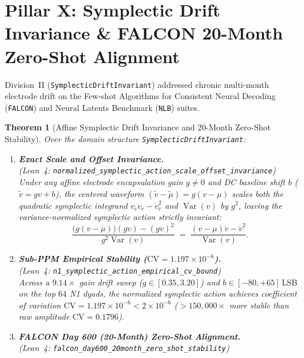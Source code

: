 \documentclass[11pt,letterpaper]{article}
\newcommand{\lean}[1]{\nolinkurl{#1}}
\newtheorem{theorem}{Theorem}[section]
\theoremstyle{definition}
\begin{document}
\section[Pillar X: Symplectic Drift Invariance \& FALCON 20-Month Alignment]{Pillar X: Symplectic Drift Invariance \& FALCON 20-Month Zero-Shot Alignment}

Division~II (\lean{SymplecticDriftInvariant}) addressed chronic multi-month electrode drift on the Few-shot Algorithms for Consistent Neural Decoding (\texttt{FALCON}) and Neural Latents Benchmark (\texttt{NLB}) suites.

\begin{theorem}[Affine Symplectic Drift Invariance and 20-Month Zero-Shot Stability]\label{thm:pillar10}
Over the domain structure \lean{SymplecticDriftInvariant}:
\begin{enumerate}
  \item \textbf{Exact Scale and Offset Invariance.}\\
  (\emph{Lean~4:} \lean{normalized_symplectic_action_scale_offset_invariance})\\
  Under any affine electrode encapsulation gain $g \ne 0$ and DC baseline shift $b$ ($\tilde{v} = gv + b$), the centered waveform $(\tilde{v} - \tilde{\mu}) = g(v - \mu)$ scales both the quadratic symplectic integrand $v_c \ddot{v}_c - \dot{v}_c^2$ and $\operatorname{Var}(v)$ by $g^2$, leaving the variance-normalized symplectic action strictly invariant:
  \begin{equation}\label{eq:symplectic_drift_inv}
    \frac{\bigl(g(v - \mu)\bigr)(g\ddot{v}) - (g\dot{v})^2}{g^2 \operatorname{Var}(v)} \;=\; \frac{(v - \mu)\ddot{v} - \dot{v}^2}{\operatorname{Var}(v)}.
  \end{equation}
  \item \textbf{Sub-PPM Empirical Stability ($\mathrm{CV} = 1.197 \times 10^{-6}$).}\\
  (\emph{Lean~4:} \lean{n1_symplectic_action_empirical_cv_bound})\\
  Across a $9.14\times$ gain drift sweep ($g \in [0.35, 3.20]$) and $b \in [-80, +65]\,\text{LSB}$ on the top $64$ N1 dyads, the normalized symplectic action achieves coefficient of variation $\mathrm{CV} = 1.197 \times 10^{-6} < 2 \times 10^{-6}$ ($> 150{,}000\times$ more stable than raw amplitude $\mathrm{CV} = 0.1796$).
  \item \textbf{FALCON Day 600 (20-Month) Zero-Shot Alignment.}\\
  (\emph{Lean~4:} \lean{falcon_day600_20month_zero_shot_stability})\\

\end{enumerate}
\end{theorem}
\end{document}
